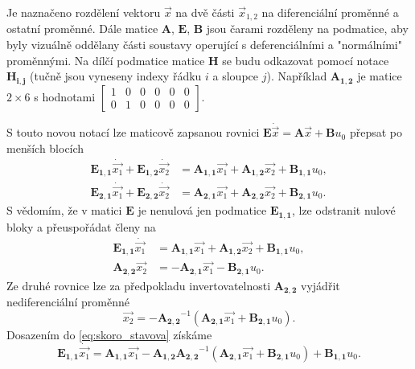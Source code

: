 \documentclass[twoside]{article}
\begin{document}
Je naznačeno rozdělení vektoru $\vec{x}$ na dvě části $\vec{x}_{1,2}$ na diferenciální proměnné a ostatní proměnné.
Dále matice $\mathbf{A}$, $\mathbf{E}$, $\mathbf{B}$ jsou čarami rozděleny na podmatice, aby byly vizuálně oddělany části soustavy
operující s deferenciálními a "normálními" proměnnými. Na dílčí podmatice matice $\mathbf{H}$ se budu odkazovat
pomocí notace $\mathbf{H_{i,j}}$ (tučně jsou vyneseny indexy řádku $i$ a sloupce $j$). Například $\mathbf{A_{1,2}}$ je
matice $2 \times 6$ s hodnotami $\begin{bmatrix}
	1 & 0 & 0 & 0 & 0 &0 \\
	0 & 1 & 0 & 0 & 0 &0
\end{bmatrix}$.

S touto novou notací lze maticově zapsanou rovnici $\mathbf{E} \dot{\vec{x}} = \mathbf{A} \vec{x} + \mathbf{B} u_0$ přepsat po menších blocích
\begin{equation}
	\begin{split}
		\mathbf{E_{1,1}} \dot{\vec{x_1}} + \mathbf{E_{1,2}} \dot{\vec{x_2}} &= \mathbf{A_{1,1}} \vec{x_1} + \mathbf{A_{1,2}} \vec{x_2} + \mathbf{B_{1,1}} u_0, \\
		\mathbf{E_{2,1}} \dot{\vec{x_1}} + \mathbf{E_{2,2}} \dot{\vec{x_2}} &= \mathbf{A_{2,1}} \vec{x_1} + \mathbf{A_{2,2}} \vec{x_2} + \mathbf{B_{2,1}} u_0.
	\end{split}
\end{equation}
S vědomím, že v matici $\mathbf{E}$ je nenulová jen podmatice $\mathbf{E_{1,1}}$, lze odstranit nulové bloky a přeuspořádat členy na
\begin{equation}
	\begin{split}
		\mathbf{E_{1,1}} \dot{\vec{x_1}}  &= \mathbf{A_{1,1}} \vec{x_1} + \mathbf{A_{1,2}} \vec{x_2} + \mathbf{B_{1,1}} u_0, \\
		\mathbf{A_{2,2}} \vec{x_2} &= -\mathbf{A_{2,1}} \vec{x_1} - \mathbf{B_{2,1}} u_0.
		\label{eq:skoro_stavova}
	\end{split}
\end{equation}
Ze druhé rovnice lze za předpokladu invertovatelnosti $\mathbf{A_{2,2}}$ vyjádřit nediferenciální proměnné
\begin{equation}
	\vec{x_2} = -\mathbf{A_{2,2}}^{-1} (\mathbf{A_{2,1}} \vec{x_1} + \mathbf{B_{2,1}} u_0).
\end{equation}
Dosazením do \eqref{eq:skoro_stavova} získáme
\begin{equation}
	\mathbf{E_{1,1}} \dot{\vec{x_1}}  = \mathbf{A_{1,1}} \vec{x_1} - \mathbf{A_{1,2}} \mathbf{A_{2,2}}^{-1} (\mathbf{A_{2,1}} \vec{x_1} + \mathbf{B_{2,1}} u_0) + \mathbf{B_{1,1}} u_0.
	\label{eq:stavovy}
\end{equation}
\end{document}
